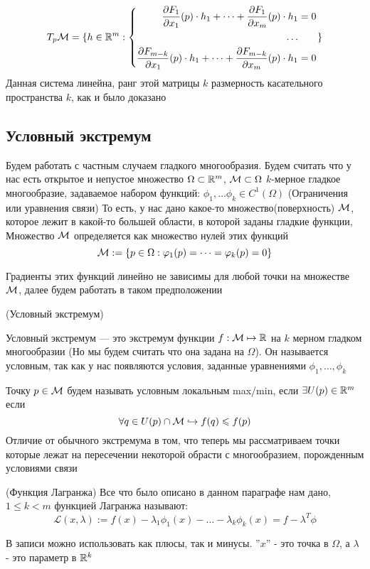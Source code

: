     $$T_p \mathcal{M} = \{h \in \mathbb{R}^m: \left\{ 
    \begin{aligned} 
  \frac{\partial F_1}{\partial x_1}(p)\cdot h_1 + \dots +\frac{\partial F_1}{\partial x_m}(p)\cdot h_1 &= 0 \\
  \dots \\
  \frac{\partial F_{m-k}}{\partial x_1}(p)\cdot h_1 + \dots +\frac{\partial F_{m-k}}{\partial x_m}(p)\cdot h_1 &= 0 
\end{aligned} \right.
\}$$
Данная система линейна, ранг этой матрицы $k$ размерность касательного пространства $k$, как и было доказано

\subsection{Условный экстремум}

Будем работать с частным случаем гладкого многообразия. Будем считать что у нас есть открытое и непустое множество $\Omega  \subset \mathbb{R}^m$, $\mathcal{M} \subset \Omega$ $k$-мерное гладкое многообразие, задаваемое набором функций:
$ \phi_1, \dots \phi_k \in C^1(\Omega)$ (Ограничения или уравнения связи)
То есть, у нас дано какое-то множество(поверхность) $\mathcal{M}$, которое лежит в какой-то большей области, в которой заданы гладкие функции, Множество $\mathcal{M}$ определяется как множество нулей этих функций
$$\mathcal{M} := \{ p \in \Omega: \varphi_1(p) = \dots = \varphi_k(p) = 0 \}$$

Градиенты этих функций линейно не зависимы для любой точки на множестве $\mathcal{M}$, далее будем работать в таком предположении

\begin{definition} (Условный экстремум)

Условный экстремум — это экстремум функции $f: \mathcal{M} \mapsto \mathbb{R}$  на $k$ мерном гладком многообразии (Но мы будем считать что она задана на $\Omega$). Он называется условным, так как у нас появляются условия, заданные уравнениями $\phi_1, \dots, \phi_k$
    
\end{definition}

\begin{definition}
    Точку $p \in \mathcal{M}$ будем называть условным локальным max/min, если $\exists U(p) \in \mathbb{R}^m$ если $$\forall q \in U(p) \cap \mathcal{M} \hookrightarrow f(q) \leqslant f(p)$$ Отличие от обычного экстремума в том, что теперь мы рассматриваем точки которые лежат на пересечении некоторой обрасти с многообразием, порожденным условиями связи
\end{definition}

\begin{definition} (Функция Лагранжа)
Все что было описано в данном параграфе нам дано, $1 \leq k < m$ функцией Лагранжа называют:
$$\mathcal{L} (x, \lambda) := f(x) - \lambda_1 \phi_1(x) - \dots - \lambda_k \phi_k(x) = f - \lambda ^{T} \phi$$

В записи можно использовать как плюсы, так и минусы. ''$x$'' - это точка в $\Omega$, а $\lambda$ - это параметр в $\mathbb{R}^k$
\end{definition}


\begin{theorem}
    
\end{theorem}
